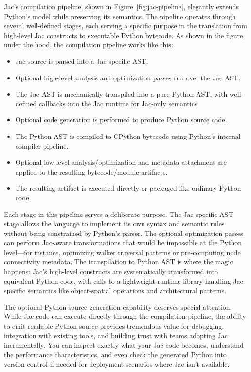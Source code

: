Jac's compilation pipeline, shown in Figure~\ref{fig:jac-pipeline}, elegantly extends Python's model while preserving its semantics. The pipeline operates through several well-defined stages, each serving a specific purpose in the translation from high-level Jac constructs to executable Python bytecode. As shown in the figure, under the hood, the compilation pipeline works like this:

\begin{itemize}
    \item Jac source is parsed into a Jac-specific AST.
    \item Optional high-level analysis and optimization passes run over the Jac AST.
    \item The Jac AST is mechanically transpiled into a pure Python AST, with well-defined callbacks into the Jac runtime for Jac-only semantics.
    \item Optional code generation is performed to produce Python source code.
    \item The Python AST is compiled to CPython bytecode using Python's internal compiler pipeline.
    \item Optional low-level analysis/optimization and metadata attachment are applied to the resulting bytecode/module artifacts.
    \item The resulting artifact is executed directly or packaged like ordinary Python code.
\end{itemize}

Each stage in this pipeline serves a deliberate purpose. The Jac-specific AST stage allows the language to implement its own syntax and semantic rules without being constrained by Python's parser. The optional optimization passes can perform Jac-aware transformations that would be impossible at the Python level—for instance, optimizing walker traversal patterns or pre-computing node connectivity metadata. The transpilation to Python AST is where the magic happens: Jac's high-level constructs are systematically transformed into equivalent Python code, with calls to a lightweight runtime library handling Jac-specific semantics like object-spatial operations and architectural patterns.

The optional Python source generation capability deserves special attention. While Jac code can execute directly through the compilation pipeline, the ability to emit readable Python source provides tremendous value for debugging, integration with existing tools, and building trust with teams adopting Jac incrementally. You can inspect exactly what your Jac code becomes, understand the performance characteristics, and even check the generated Python into version control if needed for deployment scenarios where Jac isn't available.

